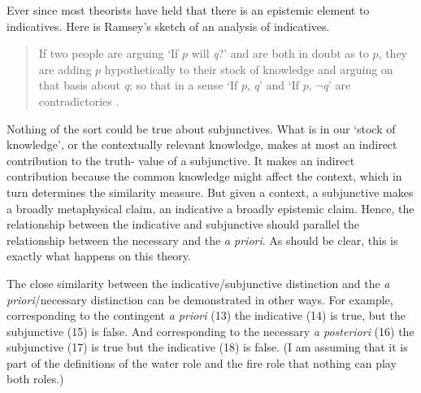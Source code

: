 Ever since \citet{Ramsey1929} most theorists have held that there is an epistemic element to indicatives. Here is Ramsey's sketch of an analysis of indicatives.

\begin{quote}
If two people are arguing `If \(p\) will \textit{q}?' and are both in doubt as to \(p\), they are adding \(p\) hypothetically to their stock of knowledge and arguing on that basis about \textit{q}; so that in a sense `If \(p\), \textit{q}' and `If \(p\), \(\neg\)\textit{q}' are contradictories \citep[247n]{Ramsey1929}.
\end{quote}

\noindent Nothing of the sort could be true about subjunctives. What is in our `stock of knowledge', or the contextually relevant knowledge, makes at most an indirect contribution to the truth\nobreakdash- value of a subjunctive. It makes an indirect contribution because the common knowledge might affect the context, which in turn determines the similarity measure. But given a context, a subjunctive makes a broadly metaphysical claim, an indicative a broadly epistemic claim. Hence, the relationship between the indicative and subjunctive should parallel the relationship between the necessary and the \textit{a priori}. As should be clear, this is exactly what happens on this theory.

The close similarity between the indicative\slash subjunctive distinction and the \textit{a priori}\slash necessary distinction can be demonstrated in other ways. For example, corresponding to the contingent \textit{a priori} (13) the indicative (14) is true, but the subjunctive (15) is false. And corresponding to the necessary \textit{a posteriori} (16) the subjunctive (17) is true but the indicative (18) is false. (I am assuming that it is part of the definitions of the water role and the fire role that nothing can play both roles.)


